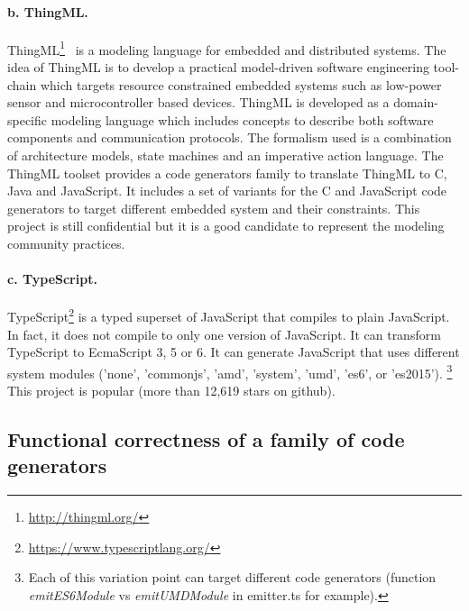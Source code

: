 \paragraph{b. ThingML.} ThingML\footnote{\url{http://thingml.org/}}~\cite{fleurey2011mde} is a modeling language for embedded and distributed systems. The idea of ThingML is to develop a practical model-driven software engineering tool-chain which targets resource constrained embedded systems such as low-power sensor and microcontroller based devices. ThingML is developed as a domain-specific modeling language which includes concepts to describe both software components and communication protocols. The formalism used is a combination of architecture models, state machines and an imperative action language. The ThingML toolset provides a  code generators family  to translate ThingML to C, Java and JavaScript. It includes a set of variants for the C and JavaScript code generators to target different embedded system and their constraints. 
This project is still confidential but it is a good candidate to represent the modeling community practices.
 
\paragraph{c. TypeScript.} TypeScript\footnote{\url{https://www.typescriptlang.org/}}\cite{rastogi2015safe} is a typed superset of JavaScript that compiles to plain JavaScript. In fact, it does not compile to only one version of JavaScript. It can transform TypeScript to EcmaScript 3, 5 or 6. It can generate JavaScript that uses different system modules ('none', 'commonjs', 'amd', 'system', 'umd', 'es6', or 'es2015'). \footnote{Each of this variation point can target different code generators (function \textit{emitES6Module} vs \textit{emitUMDModule} in emitter.ts for example).} This project is popular (more than 12,619 stars on github).


\subsection{Functional  correctness of a family of code generators}


